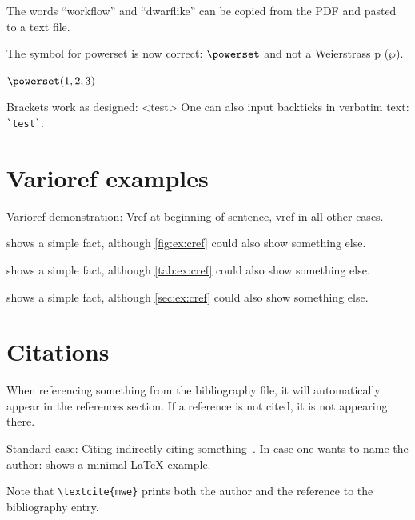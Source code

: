 \documentclass[
  numbers=noenddot,
  english,  %
  a4paper,  %
  twoside,  %
  bibliography=totoc,
  headsepline,
  cleardoublepage=empty,
  parskip=half,
  draft=false
]{scrbook}
\theoremstyle{break}
\begin{document}
\begin{ltgexample}
The words \enquote{workflow} and \enquote{dwarflike} can be copied from the PDF and pasted to a text file.
\end{ltgexample}

\begin{ltgexample}
The symbol for powerset is now correct: $\powerset$ and not a Weierstrass p ($\wp$).

$\powerset({1,2,3})$
\end{ltgexample}

\begin{ltgexample}
Brackets work as designed:
<test>
One can also input backticks in verbatim text: \verb|`test`|.
\end{ltgexample}


\section{Varioref examples}
\label{sec:ex:vref}

Varioref demonstration: Vref at beginning of sentence, vref in all other cases.

\begin{ltgexample}
 shows a simple fact, although \vref{fig:ex:cref} could also show something else.

 shows a simple fact, although \vref{tab:ex:cref} could also show something else.

 shows a simple fact, although \vref{sec:ex:cref} could also show something else.
\end{ltgexample}

\section{Citations}

When referencing something from the bibliography file, it will automatically appear in the references section.
If a reference is not cited, it is not appearing there.

\begin{ltgexample}
Standard case: Citing indirectly citing something~\cite{mwe}.
In case one wants to name the author: \textcite{mwe} shows a minimal \LaTeX{} example.
\end{ltgexample}

Note that \texttt{\textbackslash textcite\{mwe\}} prints both the author and the reference to the bibliography entry.
\end{document}
